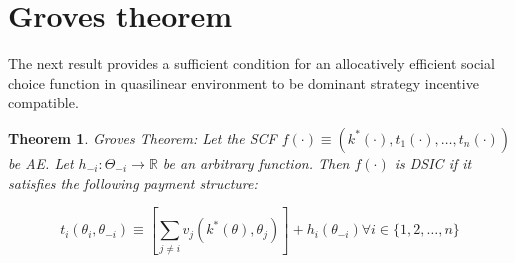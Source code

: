 \documentclass[10pt,a4paper]{article}
\newtheorem{theorem}{Theorem}
\begin{document}
\section{Groves theorem}
The next result provides a sufficient condition for an allocatively efficient
social choice function in quasilinear environment to be dominant strategy
incentive compatible. 

\begin{theorem}{Groves Theorem}: Let the SCF $f(\cdot) \equiv (k^*(\cdot), t_1(\cdot), \dots, t_n(\cdot))$ be AE. 
Let $h_{-i}: \Theta_{-i} \rightarrow \mathbb R$ be an arbitrary function.
Then $f(\cdot)$ is DSIC if it satisfies the following payment structure:

\begin{equation}
t_i(\theta_i, \theta_{-i}) \equiv 
    \left[ \sum_{j \neq i} v_j(k^*(\theta), \theta_j) \right] + h_i(\theta_{-i}) \forall i \in \{1, 2, \dots, n\}
\end{equation}
\end{theorem}
\end{document}
